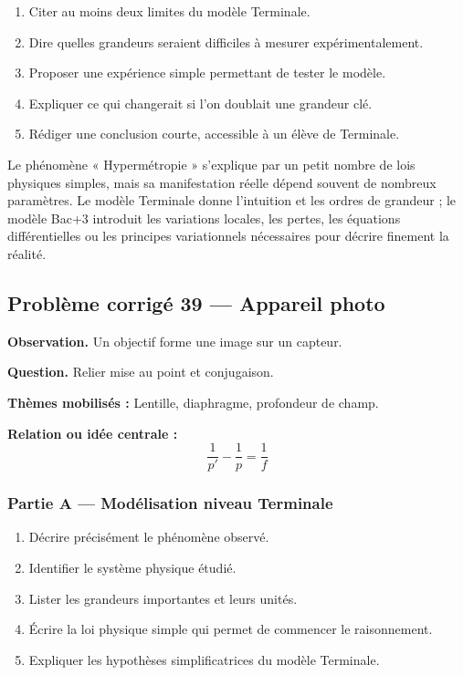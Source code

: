 \documentclass[11pt,a4paper]{article}
\begin{document}
\begin{enumerate}
  \item Citer au moins deux limites du modèle Terminale.
  \item Dire quelles grandeurs seraient difficiles à mesurer expérimentalement.
  \item Proposer une expérience simple permettant de tester le modèle.
  \item Expliquer ce qui changerait si l'on doublait une grandeur clé.
  \item Rédiger une conclusion courte, accessible à un élève de Terminale.
\end{enumerate}

\begin{corrigebox}
Le phénomène « Hypermétropie » s'explique par un petit nombre de lois physiques simples, mais sa manifestation réelle dépend souvent de nombreux paramètres. Le modèle Terminale donne l'intuition et les ordres de grandeur ; le modèle Bac+3 introduit les variations locales, les pertes, les équations différentielles ou les principes variationnels nécessaires pour décrire finement la réalité.
\end{corrigebox}

\subsection{Problème corrigé 39 — Appareil photo}

\begin{exercicebox}
\textbf{Observation.} Un objectif forme une image sur un capteur.

\medskip
\textbf{Question.} Relier mise au point et conjugaison.

\medskip
\textbf{Thèmes mobilisés :} Lentille, diaphragme, profondeur de champ.

\medskip
\textbf{Relation ou idée centrale :}
\[
\frac1{p'}-\frac1p=\frac1f
\]
\end{exercicebox}

\subsubsection*{Partie A — Modélisation niveau Terminale}

\begin{enumerate}
  \item Décrire précisément le phénomène observé.
  \item Identifier le système physique étudié.
  \item Lister les grandeurs importantes et leurs unités.
  \item Écrire la loi physique simple qui permet de commencer le raisonnement.
  \item Expliquer les hypothèses simplificatrices du modèle Terminale.
\end{enumerate}
\end{document}
